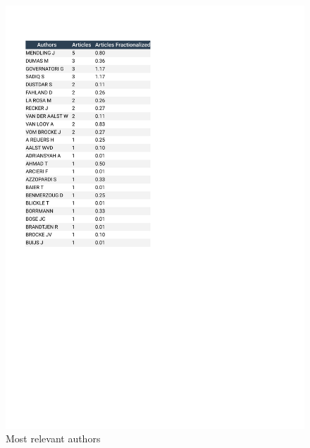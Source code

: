 \documentclass[
  letterpaper,
  DIV=11,
  numbers=noendperiod]{scrreprt}
\begin{document}
\begin{figure}

{\centering \includegraphics{./static/Most_Relevant_Authors.pdf}

}

\caption{\label{fig-authors}Most relevant authors}

\end{figure}
\end{document}
